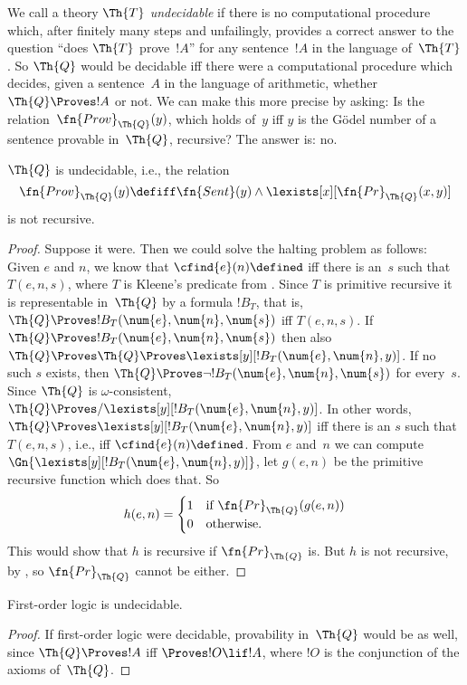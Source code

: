 \documentclass[../../include/open-logic-section]{subfiles}
\begin{document}

We call a theory $\Th{T}$ \emph{undecidable} if there is no
computational procedure which, after finitely many steps and
unfailingly, provides a correct answer to the question ``does $\Th{T}$
prove~$!A$'' for any sentence~$!A$ in the language of~$\Th{T}$.  So
$\Th{Q}$ would be decidable iff there were a computational procedure
which decides, given a sentence~$A$ in the language of arithmetic,
whether $\Th{Q} \Proves !A$ or not.  We can make this more precise by
asking: Is the relation~$\fn{Prov}_{\Th{Q}}(y)$, which holds of~$y$
iff $y$ is the G\"odel number of a sentence provable in~$\Th{Q}$,
recursive?  The answer is: no. 

\begin{thm}
$\Th{Q}$ is undecidable, i.e., the relation 
\[
\fn{Prov}_{\Th{Q}}(y) \defiff \fn{Sent}(y) \land
\lexists[x][\fn{Pr}_{\Th{Q}}(x, y)]
\]
is not recursive.
\end{thm}

\begin{proof}
Suppose it were.  Then we could solve the halting problem as follows:
Given $e$ and $n$, we know that $\cfind{e}(n) \defined$ iff there is
an~$s$ such that $T(e, n, s)$, where $T$ is Kleene's predicate from
. Since $T$ is primitive recursive
it is representable in~$\Th{Q}$ by a formula $!B_T$, that is, $\Th{Q}
\Proves !B_T(\num{e}, \num{n}, \num{s})$ iff $T(e, n, s)$.  If $\Th{Q}
\Proves !B_T(\num{e}, \num{n}, \num{s})$ then also $\Th{Q} \Proves
\Th{Q} \Proves \lexists[y][!B_T(\num{e}, \num{n}, y)]$. If no such $s$
exists, then $\Th{Q} \Proves \lnot !B_T(\num{e}, \num{n}, \num{s})$
for every~$s$. Since $\Th{Q}$ is $\omega$-consistent, $\Th{Q} \Proves/
\lexists[y][!B_T(\num{e}, \num{n}, y)]$.  In other words,
$\Th{Q} \Proves \lexists[y][!B_T(\num{e}, \num{n}, y)]$ iff
there is an $s$ such that $T(e, n, s)$, i.e., iff $\cfind{e}(n)
\defined$.  From $e$ and~$n$ we can compute
$\Gn{\lexists[y][!B_T(\num{e}, \num{n}, y)]}$, let $g(e, n)$
be the primitive recursive function which does that. So
\[
h(e, n) = 
\begin{cases}
1 & \text{if $\fn{Pr}_{\Th{Q}}(g(e, n))$}\\
0 & \text{otherwise}.
\end{cases}
\]
This would show that $h$ is recursive if $\fn{Pr}_{\Th{Q}}$ is. But
$h$ is not recursive, by ,
so $\fn{Pr}_{\Th{Q}}$ cannot be either.
\end{proof}

\begin{cor}
First-order logic is undecidable.
\end{cor}

\begin{proof}
If first-order logic were decidable, provability in~$\Th{Q}$ would be
as well, since $\Th{Q} \Proves !A$ iff $\Proves !O \lif !A$, where
$!O$ is the conjunction of the axioms of~$\Th{Q}$.
\end{proof}
\end{document}
